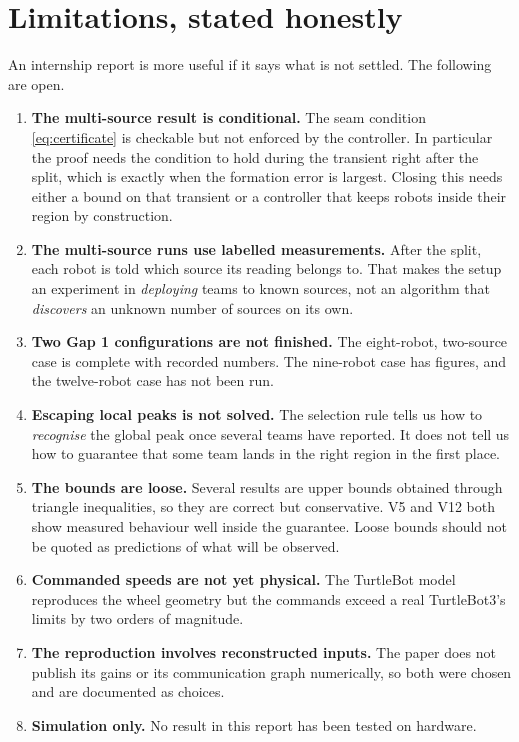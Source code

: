\documentclass[11pt,a4paper]{article}
\begin{document}
\section{Limitations, stated honestly}

An internship report is more useful if it says what is not settled. The following are open.

\begin{enumerate}
    \item \textbf{The multi-source result is conditional.} The seam condition \eqref{eq:certificate}
    is checkable but not enforced by the controller. In particular the proof needs the condition to
    hold during the transient right after the split, which is exactly when the formation error is
    largest. Closing this needs either a bound on that transient or a controller that keeps robots
    inside their region by construction.
    \item \textbf{The multi-source runs use labelled measurements.} After the split, each robot is
    told which source its reading belongs to. That makes the setup an experiment in \emph{deploying}
    teams to known sources, not an algorithm that \emph{discovers} an unknown number of sources on
    its own.
    \item \textbf{Two Gap 1 configurations are not finished.} The eight-robot, two-source case is
    complete with recorded numbers. The nine-robot case has figures, and the twelve-robot case has
    not been run.
    \item \textbf{Escaping local peaks is not solved.} The selection rule tells us how to
    \emph{recognise} the global peak once several teams have reported. It does not tell us how to
    guarantee that some team lands in the right region in the first place.
    \item \textbf{The bounds are loose.} Several results are upper bounds obtained through triangle
    inequalities, so they are correct but conservative. V5 and V12 both show measured behaviour well
    inside the guarantee. Loose bounds should not be quoted as predictions of what will be observed.
    \item \textbf{Commanded speeds are not yet physical.} The TurtleBot model reproduces the wheel
    geometry but the commands exceed a real TurtleBot3's limits by two orders of magnitude.
    \item \textbf{The reproduction involves reconstructed inputs.} The paper does not publish its
    gains or its communication graph numerically, so both were chosen and are documented as choices.
    \item \textbf{Simulation only.} No result in this report has been tested on hardware.
\end{enumerate}
\end{document}
